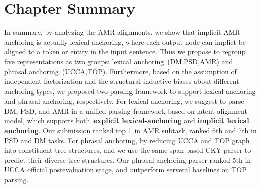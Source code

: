 \section{Chapter Summary}
\label{sec:conclusion}

In summary, by analyzing the AMR alignments, we show that implicit AMR
anchoring is actually lexical anchoring, where each output node can
implict be aligned to a token or entity in the input sentence. Thus we
propose to regroup five representations as two groups: lexical
anchoring~(DM,PSD,AMR) and phrasal anchoring~(UCCA,TOP). Furthermore,
based on the assumption of independent factorization and the
structural inductive biases about different anchoring-types, we
proposed two parsing framework to support lexical anchoring and phrasal
anchoring, respectively.  For lexical anchoring, we suggest to parse
DM, PSD, and AMR in a unified parsing framework based on latent
alignment model, which supports both~\textbf{explicit
  lexical-anchoring} and \textbf{implicit lexical anchoring}. Our
submission ranked top 1 in AMR subtask, ranked 6th and 7th in PSD and
DM tasks. For phrasal anchoring, by reducing UCCA and TOP graph into
constituent tree structures, and we use the same span-based CKY parser
to predict their diverse tree structures. Our phrasal-anchoring parser
ranked 5th in UCCA official postevaluation stage, and outperform
serveral baselines on TOP parsing.

